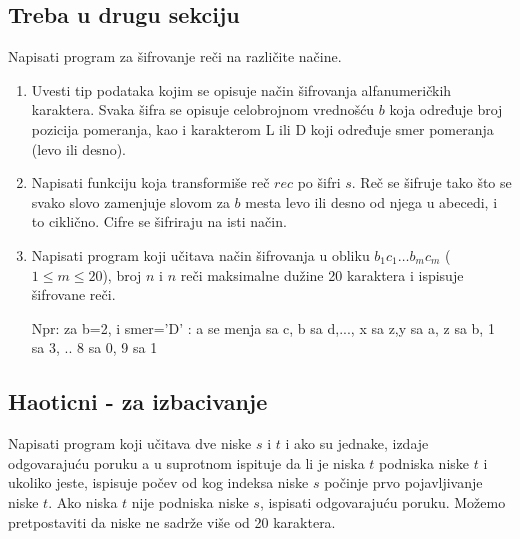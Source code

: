 \subsection{Treba u drugu sekciju}

\begin{Exercise}[label=p2.3_] Napisati program za šifrovanje reči na različite načine.
\begin{enumerate}
 \item  Uvesti tip podataka  kojim se opisuje način
   šifrovanja alfanumeričkih karaktera.  Svaka šifra se
   opisuje celobrojnom vrednošću $b$ koja određuje broj
   pozicija pomeranja, kao i karakterom L ili D koji
   određuje smer pomeranja (levo ili desno).
  \item Napisati funkciju 
    koja transformiše reč $rec$ po šifri
    $s$. Reč se šifruje tako što se svako slovo
    zamenjuje slovom za $b$ mesta levo ili desno od njega u
    abecedi, i to ciklično. Cifre se šifriraju na isti način.
 \item Napisati program koji učitava način šifrovanja u
   obliku $b_1 c_1 \ldots b_m c_m$ ($1\leq m \leq 20$), broj $n$ i $n$ re\v ci maksimalne dužine 20 karaktera i ispisuje šifrovane reči.

Npr: za b=2,
i smer='D' : a se menja sa c, b sa d,..., x sa z,y sa a, z sa b, 1
sa 3, .. 8 sa 0, 9 sa 1
\end{enumerate}
\end{Exercise}
\begin{Answer}[ref=p2.3_]
\end{Answer}



\subsection{Haoticni - za izbacivanje}


\begin{Exercise}[label=v2.3_07] 
   Napisati program koji učitava dve niske $s$ i $t$ i ako su jednake, izdaje odgovarajuću poruku a u suprotnom ispituje da li je niska $t$ podniska niske $t$ i ukoliko jeste, ispisuje počev od kog indeksa niske $s$ počinje prvo pojavljivanje niske $t$. Ako niska $t$ nije podniska niske $s$, ispisati odgovarajuću poruku. Možemo
   pretpostaviti da niske ne sadrže više od 20 karaktera.

\end{Exercise}
\begin{Answer}[ref=v2.3_07]
\end{Answer}


